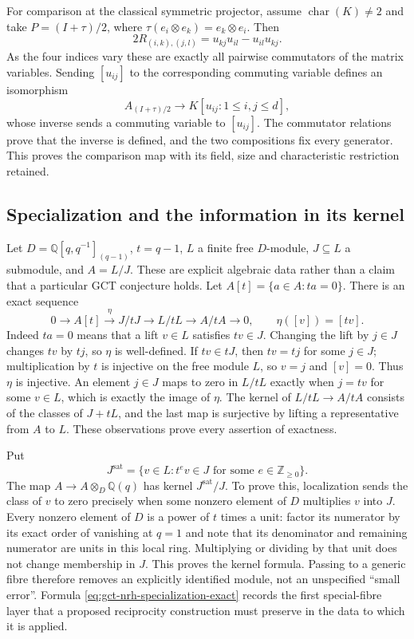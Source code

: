 For comparison at the classical symmetric projector, assume
$\operatorname{char}(K)\ne2$ and take $P=(I+\tau)/2$, where
$\tau(e_i\otimes e_k)=e_k\otimes e_i$.  Then
\[
 2R_{(i,k),(j,l)}
   =u_{kj}u_{il}-u_{il}u_{kj}.
\]
As the four indices vary these are exactly all pairwise commutators of
the matrix variables.  Sending $[u_{ij}]$ to the corresponding commuting
variable defines an isomorphism
\[
 A_{(I+\tau)/2}\longrightarrow K[u_{ij}:1\le i,j\le d],
\]
whose inverse sends a commuting variable to $[u_{ij}]$.  The commutator
relations prove that the inverse is defined, and the two compositions
fix every generator.  This proves the comparison map with its field,
size and characteristic restriction retained.

\subsection{Specialization and the information in its kernel}

Let $D=\mathbb Q[q,q^{-1}]_{(q-1)}$, $t=q-1$, $L$ a finite free
$D$-module, $J\subseteq L$ a submodule, and $A=L/J$.  These are explicit
algebraic data rather than a claim that a particular GCT conjecture
holds.  Let $A[t]=\{a\in A:ta=0\}$.  There is an exact sequence
\begin{equation}\label{eq:gct-nrh-specialization-exact}
 0\longrightarrow A[t]\xrightarrow{\eta}J/tJ
 \longrightarrow L/tL\longrightarrow A/tA\longrightarrow0,
 \qquad \eta([v])=[tv].
\end{equation}
Indeed $ta=0$ means that a lift $v\in L$ satisfies $tv\in J$.
Changing the lift by $j\in J$ changes $tv$ by $tj$, so $\eta$ is
well-defined.  If $tv\in tJ$, then $tv=tj$ for some $j\in J$; multiplication
by $t$ is injective on the free module $L$, so $v=j$ and $[v]=0$.
Thus $\eta$ is injective.  An element $j\in J$ maps to zero in $L/tL$
exactly when $j=tv$ for some $v\in L$, which is exactly the image of
$\eta$.  The kernel of $L/tL\to A/tA$ consists of the classes of
$J+tL$, and the last map is surjective by lifting a representative from
$A$ to $L$.  These observations prove every assertion of exactness.

Put
\[
 J^{\mathrm{sat}}=
  \{v\in L:t^e v\in J\text{ for some }e\in\mathbb Z_{\ge0}\}.
\]
The map $A\to A\otimes_D\mathbb Q(q)$ has kernel
$J^{\mathrm{sat}}/J$.  To prove this, localization sends the class of
$v$ to zero precisely when some nonzero element of $D$ multiplies $v$
into $J$.  Every nonzero element of $D$ is a power of $t$ times a unit:
factor its numerator by its exact order of vanishing at $q=1$ and note
that its denominator and remaining numerator are units in this local
ring.  Multiplying or dividing by that unit does not change membership
in $J$.  This proves the kernel formula.  Passing to a generic fibre
therefore removes an explicitly identified module, not an unspecified
``small error''.  Formula \eqref{eq:gct-nrh-specialization-exact} records
the first special-fibre layer that a proposed reciprocity construction
must preserve in the data to which it is applied.

